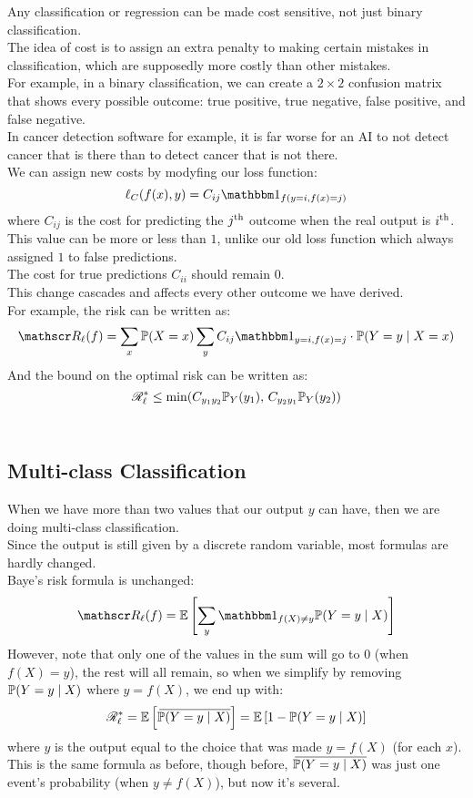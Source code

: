 \documentclass[12pt]{article}
\begin{document}
Any classification or regression can be
made cost sensitive,
not just binary classification. \\

The idea of cost is to assign an extra penalty
to making certain mistakes in classification,
which are supposedly more costly than other
mistakes. \\
For example, in a binary classification,
we can create a $2 \times 2$ confusion matrix
that shows every possible outcome:
true positive, true negative, false positive,
and false negative. \\
In cancer detection software for example,
it is far worse for an AI to not detect cancer
that is there than to detect cancer that is not
there. \\

We can assign new costs
by modyfing our loss function:
\[ \ell_C(f(x), y) = 
C_{ij}\indicator_{f(y = i, f(x) = j)} \]
where $C_{ij}$
is the cost for predicting
the $j^{\text{th}}$ outcome
when the real output is $i^{\text{th}}$. \\
This value can be more or less than $1$,
unlike our old loss function which always
assigned $1$ to false predictions. \\
The cost for true predictions $C_{ii}$
should remain $0$. \\

This change cascades and affects
every other outcome we have derived. \\
For example,
the risk can be written as:
\[ \rscr_\ell(f)
= \sum_{x} \pbb(X = x)
\sum_{y} C_{ij}\indicator_{y = i, f(x) = j}\cdot
\pbb(Y = y \mid X = x) \]
And the bound on the optimal risk can be
written as:
\[ \mathscr{R}_\ell^* \leq \min(
C_{y_1y_2}\mathbb{P}_Y(y_1), \, 
C_{y_2y_1}\mathbb{P}_Y(y_2)) \] \\

\newpage

\subsection*{Multi-class Classification}

When we have more than two values that
our output $y$ can have,
then we are doing multi-class classification. \\

Since the output is still given by a discrete
random variable, most formulas
are hardly changed. \\

Baye's risk formula is
unchanged:
\[ \rscr_\ell(f)
= \ebb\brac{\sum_y \indicator_{f(X) \neq y}
\pbb(Y = y \mid X)} \]
However, note that only one
of the values in the sum will go to 0
(when $f(X) = y$),
the rest will all remain,
so when we simplify by removing
$\mathbb{P}(Y = y \mid X)$
where $y = f(X)$,
we end up with:
\[ \mathscr{R}_\ell^*
= \mathbb{E}\left[ 
\,\overline{\!{\mathbb{P}(Y = y \mid X)}} \right]
= \mathbb{E}\left[ 
1 - \mathbb{P}(Y = y \mid X) \right] \]
where $y$ is the output
equal to the choice that was made
$y = f(X)$ (for each $x$). \\
This is the same formula as before,
though before, $\,\overline{\!{\mathbb{P}(Y = y \mid X)}}$
was just one event's probability
(when $y \neq f(X)$),
but now it's several. \\
\end{document}

